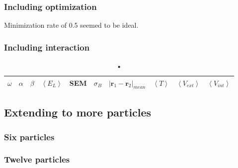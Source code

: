 \subsubsection{Including optimization}

Minimization rate of 0.5 seemed to be ideal. 

\subsubsection{Including interaction}

\begin{table}[H]\caption{•}\label{Ground state energy of two interacting electrons in harmonic oscillator trap. Number of MC cycles are $2^{22}$ .}
\center
\begin{tabular}{c|ccccccccc}
$\omega$ & $\alpha$ & $\beta$ & $\left< E_L \right>$ & SEM & $\sigma_B$ & $|\bm{r}_1-\bm{r}_2|_{mean}$ & $\left< T \right>$  & $\left< V_{ext}\right>$ & $\left<V_{int} \right>$  \\ \hline

\end{tabular}
\end{table}

\subsection{Extending to more particles}

\subsubsection{Six particles}

\subsubsection{Twelve particles}


